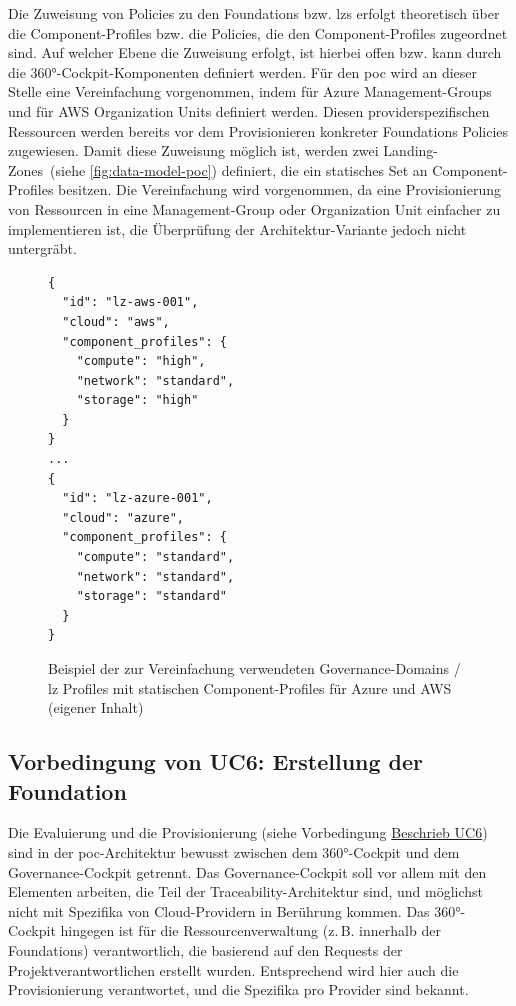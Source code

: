 Die Zuweisung von Policies zu den Foundations bzw. \ac{lz}s erfolgt theoretisch über die Component-Profiles bzw. die Policies, die den Component-Profiles zugeordnet sind. Auf welcher Ebene die Zuweisung erfolgt, ist hierbei offen bzw. kann durch die 360°-Cockpit-Komponenten definiert werden. Für den \ac{poc} wird an dieser Stelle eine Vereinfachung vorgenommen, indem für Azure Management-Groups und für AWS Organization Units definiert werden. Diesen providerspezifischen Ressourcen werden bereits vor dem Provisionieren konkreter Foundations Policies zugewiesen. Damit diese Zuweisung möglich ist, werden zwei \flqq Landing-Zones\frqq\ (siehe \autoref{fig:data-model-poc}) definiert, die ein statisches Set an Component-Profiles besitzen. Die Vereinfachung wird vorgenommen, da eine Provisionierung von Ressourcen in eine Management-Group oder Organization Unit einfacher zu implementieren ist, die Überprüfung der Architektur-Variante jedoch nicht untergräbt.

\begin{figure}[H]
\centering
\begin{lstlisting}
{
  "id": "lz-aws-001",
  "cloud": "aws",
  "component_profiles": {
    "compute": "high",
    "network": "standard",
    "storage": "high"
  }
}
...
{
  "id": "lz-azure-001",
  "cloud": "azure",
  "component_profiles": {
    "compute": "standard",
    "network": "standard",
    "storage": "standard"
  }
}
\end{lstlisting}
\caption{Beispiel der zur Vereinfachung verwendeten Governance-Domains / \ac{lz} Profiles mit statischen Component-Profiles für Azure und AWS (eigener Inhalt)}
\label{fig:governance-domains-example}
\end{figure}

\subsection{Vorbedingung von UC6: Erstellung der Foundation}

Die Evaluierung und die Provisionierung (siehe Vorbedingung \hyperlink{usecase-uc6}{Beschrieb UC6}) sind in der \ac{poc}-Architektur bewusst zwischen dem 360°-Cockpit und dem Governance-Cockpit getrennt. Das Governance-Cockpit soll vor allem mit den Elementen arbeiten, die Teil der Traceability-Architektur sind, und möglichst nicht mit Spezifika von Cloud-Providern in Berührung kommen. Das 360°-Cockpit hingegen ist für die Ressourcenverwaltung (z.\,B. innerhalb der Foundations) verantwortlich, die basierend auf den Requests der Projektverantwortlichen erstellt wurden. Entsprechend wird hier auch die Provisionierung verantwortet, und die Spezifika pro Provider sind bekannt.

